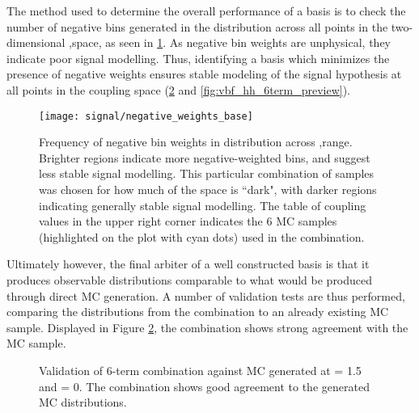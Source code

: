     The method used to determine the overall performance of a basis is to check the number of negative bins generated
        in the \mhh distribution across all points in the two-dimensional \kvv,\kl space, as seen in \ref{fig:vbf_hh_6term_nWeight_grid}.
    As negative bin weights are unphysical, they indicate poor signal modelling.
    Thus, identifying a basis which minimizes the presence of negative weights ensures stable modeling of the signal hypothesis at all points in the coupling space (\ref{fig:vbf_hh_6term_validation} and \ref{fig:vbf_hh_6term_preview}).

    \begin{figure}
        \texttt{[image: signal/negative\_weights\_base]}
        \caption{
            Frequency of negative bin weights in \mhh distribution across \kvv,\kl range.
            Brighter regions indicate more negative-weighted bins, and suggest less stable signal modelling.
            This particular combination of samples was chosen for how much of the space is ``dark",
                with darker regions indicating generally stable signal modelling.
            The table of coupling values in the upper right corner indicates the 6 MC samples
                (highlighted on the plot with cyan dots) used in the combination.
        }
        \label{fig:vbf_hh_6term_nWeight_grid}
    \end{figure}

    Ultimately however, the final arbiter of a well constructed basis is that it produces observable distributions comparable to what would be produced through direct MC generation.
    A number of validation tests are thus performed, comparing the distributions from the combination to an already existing MC sample.
    Displayed in Figure \ref{fig:vbf_hh_6term_validation}, the combination shows strong agreement with the MC sample.

    \begin{figure}
        \caption{
            Validation of 6-term combination against MC generated at \kv = 1.5 and \kl = 0.
            The combination shows good agreement to the generated MC distributions.
        }
        \label{fig:vbf_hh_6term_validation}
    \end{figure}

